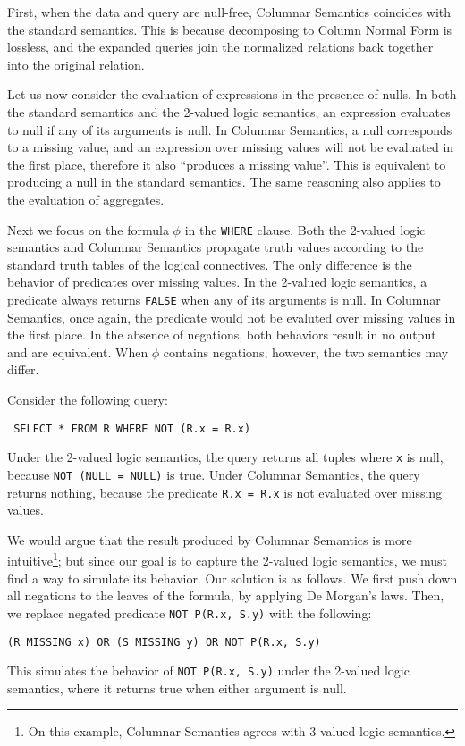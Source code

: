 \documentclass[sigconf]{acmart}
\begin{document}
First, when the data and query are null-free,
 Columnar Semantics coincides with the standard semantics.
This is because decomposing to Column Normal Form 
 is lossless, and the expanded queries 
 join the normalized relations back together 
 into the original relation.

Let us now consider the evaluation of expressions in the presence of nulls.
In both the standard semantics and the 2-valued logic semantics,
 an expression evaluates to null if any of its arguments is null.
In Columnar Semantics, 
 a null corresponds to a missing value, 
 and an expression over missing values 
 will not be evaluated in the first place,
 therefore it also ``produces a missing value''.
This is equivalent to producing a null in the standard semantics.
The same reasoning also applies to the evaluation of aggregates.

Next we focus on the formula $\phi$ in the \lstinline|WHERE| clause.
Both the 2-valued logic semantics and Columnar Semantics
 propagate truth values according to the standard 
 truth tables of the logical connectives.
The only difference is the behavior of predicates over missing values.
In the 2-valued logic semantics, 
 a predicate always returns \lstinline|FALSE| when any of its arguments is null.
In Columnar Semantics, once again, 
 the predicate would not be evaluted over missing values in the first place.
In the absence of negations,
 both behaviors result in no output and are equivalent.
When $\phi$ contains negations, however, 
 the two semantics may differ.
%
\begin{example}
Consider the following query:
\begin{lstlisting}
 SELECT * FROM R WHERE NOT (R.x = R.x)
\end{lstlisting}
Under the 2-valued logic semantics, 
 the query returns all tuples where \lstinline|x| is null, 
 because \lstinline|NOT (NULL = NULL)| is true.
Under Columnar Semantics, 
 the query returns nothing, 
 because the predicate \lstinline|R.x = R.x| is not evaluated 
 over missing values.
\end{example}
%
We would argue that the result produced 
 by Columnar Semantics is more intuitive\footnote{On this example, 
 Columnar Semantics agrees with 3-valued logic semantics.};
 but since our goal is to capture the 2-valued logic semantics,
 we must find a way to simulate its behavior.
Our solution is as follows.
We first push down all negations to the leaves of the formula, 
 by applying De Morgan's laws.
Then, we replace negated predicate \lstinline|NOT P(R.x, S.y)|
 with the following:
%
\begin{lstlisting}
(R MISSING x) OR (S MISSING y) OR NOT P(R.x, S.y)
\end{lstlisting}
% 
This simulates the behavior of \lstinline|NOT P(R.x, S.y)|
 under the 2-valued logic semantics, 
 where it returns true when either argument is null.
\end{document}
